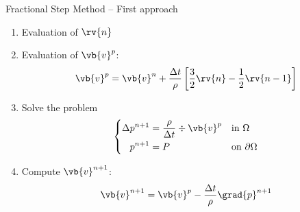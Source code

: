 \begin{algorithm}[ht]
	\caption{Fractional Step Method -- First approach}
	\label{algorithm:fsm_first_approach}
	\begin{algorithmic}[0]
		\State
		\begin{enumerate}[label=\textbf{\arabic*.},topsep=0pt]
			\item Evaluation of $\rv{n}$
			\item Evaluation of $\vb{v}^p$:
            \[
                \vb{v}^p =
                \vb{v}^n + \frac{\Delta t}{\rho} \left[ \frac{3}{2} \rv{n} - \frac{1}{2} \rv{n-1} \right]
            \]
            \item Solve the problem
            \[
                \left\{
                    \begin{aligned}
                        \Delta p^{n+1}  &= \frac{\rho}{\Delta t} \div{\vb{v}^p} & &\text{in } \Omega            \\
                        p^{n+1}         &= P                                    & &\text{on } \partial \Omega
                    \end{aligned}
                \right.
            \]
            \item Compute $\vb{v}^{n+1}$: \label{algorithm_item:fsm_first_approach}
            \[
                \vb{v}^{n+1} = \vb{v}^p - \frac{\Delta t}{\rho} \grad{p}^{n+1}
            \]
		\end{enumerate}
	\end{algorithmic}
\end{algorithm}
